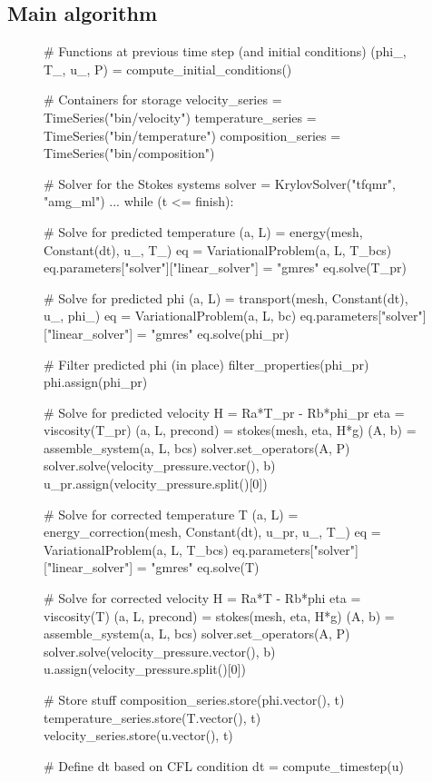 \subsection{Main algorithm}
\begin{figure}
  \begin{center}
    \begin{python}
# Functions at previous time step (and initial conditions)
(phi_, T_, u_, P) = compute_initial_conditions()

# Containers for storage
velocity_series = TimeSeries("bin/velocity")
temperature_series = TimeSeries("bin/temperature")
composition_series = TimeSeries("bin/composition")

# Solver for the Stokes systems
solver = KrylovSolver("tfqmr", "amg_ml")
...
while (t <= finish):

    # Solve for predicted temperature
    (a, L) = energy(mesh, Constant(dt), u_, T_)
    eq = VariationalProblem(a, L, T_bcs)
    eq.parameters["solver"]["linear_solver"] = "gmres"
    eq.solve(T_pr)

    # Solve for predicted phi
    (a, L) = transport(mesh, Constant(dt), u_, phi_)
    eq = VariationalProblem(a, L, bc)
    eq.parameters["solver"]["linear_solver"] = "gmres"
    eq.solve(phi_pr)

    # Filter predicted phi (in place)
    filter_properties(phi_pr)
    phi.assign(phi_pr)

    # Solve for predicted velocity
    H = Ra*T_pr - Rb*phi_pr
    eta = viscosity(T_pr)
    (a, L, precond) = stokes(mesh, eta, H*g)
    (A, b) = assemble_system(a, L, bcs)
    solver.set_operators(A, P)
    solver.solve(velocity_pressure.vector(), b)
    u_pr.assign(velocity_pressure.split()[0])

    # Solve for corrected temperature T
    (a, L) = energy_correction(mesh, Constant(dt), u_pr, u_, T_)
    eq = VariationalProblem(a, L, T_bcs)
    eq.parameters["solver"]["linear_solver"] = "gmres"
    eq.solve(T)

    # Solve for corrected velocity
    H = Ra*T - Rb*phi
    eta = viscosity(T)
    (a, L, precond) = stokes(mesh, eta, H*g)
    (A, b) = assemble_system(a, L, bcs)
    solver.set_operators(A, P)
    solver.solve(velocity_pressure.vector(), b)
    u.assign(velocity_pressure.split()[0])

    # Store stuff
    composition_series.store(phi.vector(), t)
    temperature_series.store(T.vector(), t)
    velocity_series.store(u.vector(), t)

    # Define dt based on CFL condition
    dt = compute_timestep(u)


\end{python}
\end{center}
\end{figure}
